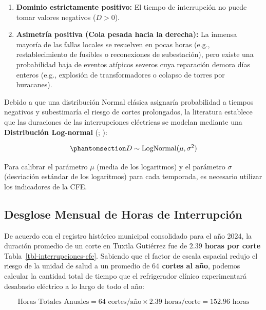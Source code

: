 \documentclass[
  spanish,
  us-letterpaper,
]{scrreprt}
\providecommand{\tightlist}{%
  \setlength{\itemsep}{0pt}\setlength{\parskip}{0pt}}
\numberwithin{equation}{section}
\theoremstyle{plain}
\theoremstyle{plain}
\theoremstyle{plain}
\theoremstyle{definition}
\theoremstyle{remark}
\begin{document}
\begin{enumerate}
\def\labelenumi{\arabic{enumi}.}
\tightlist
\item
  \textbf{Dominio estrictamente positivo:} El tiempo de interrupción no
  puede tomar valores negativos (\(D > 0\)).
\item
  \textbf{Asimetría positiva (Cola pesada hacia la derecha):} La inmensa
  mayoría de las fallas locales se resuelven en pocas horas (e.g.,
  restablecimiento de fusibles o reconexiones de subestación), pero
  existe una probabilidad baja de eventos atípicos severos cuya
  reparación demora días enteros (e.g., explosión de transformadores o
  colapso de torres por huracanes).
\end{enumerate}

Debido a que una distribución Normal clásica asignaría probabilidad a
tiempos negativos y subestimaría el riesgo de cortes prolongados, la
literatura establece que las duraciones de las interrupciones eléctricas
se modelan mediante una \textbf{Distribución Log-normal}
(;
):

\begin{equation}\phantomsection\label{eq-lognormal-def}{
D \sim \text{LogNormal}(\mu, \sigma^2)
}\end{equation}

Para calibrar el parámetro \(\mu\) (media de los logaritmos) y el
parámetro \(\sigma\) (desviación estándar de los logaritmos) para cada
temporada, es necesario utilizar los indicadores de la CFE.

\subsection{Desglose Mensual de Horas de
Interrupción}\label{desglose-mensual-de-horas-de-interrupciuxf3n}

De acuerdo con el registro histórico municipal consolidado para el año
2024, la duración promedio de un corte en Tuxtla Gutiérrez fue de
\textbf{\(2.39\) horas por corte} Tabla~\ref{tbl-interrupciones-cfe}.
Sabiendo que el factor de escala espacial redujo el riesgo de la unidad
de salud a un promedio de \textbf{\(64\) cortes al año}, podemos
calcular la cantidad total de tiempo que el refrigerador clínico
experimentará desabasto eléctrico a lo largo de todo el año:

\[
\text{Horas Totales Anuales} = 64 \text{ cortes/año} \times 2.39 \text{ horas/corte} = 152.96 \text{ horas}
\]
\end{document}
